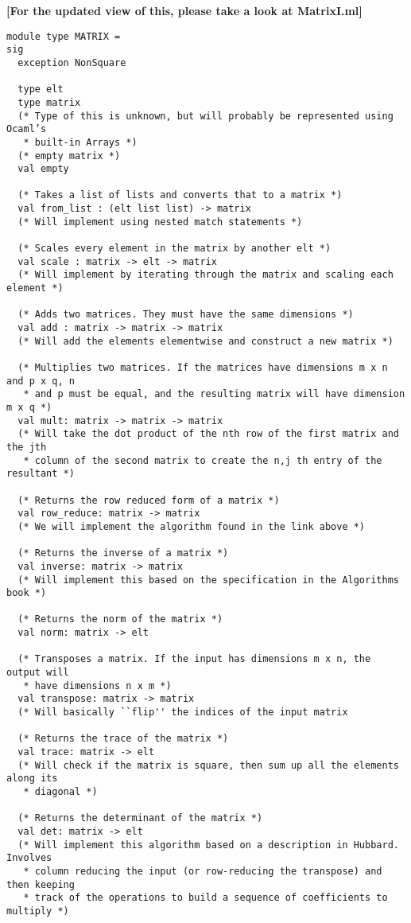 \documentclass[letterpaper,11pt]{article}
\newcommand{\annot}[1]{\textbf{\color{BrickRed} [#1]}}
\begin{document}
{\annot{For the updated view of this, please take a look at MatrixI.ml}}
\begin{verbatim}
module type MATRIX = 
sig
  exception NonSquare
  
  type elt
  type matrix
  (* Type of this is unknown, but will probably be represented using Ocaml’s
   * built-in Arrays *)
  (* empty matrix *)
  val empty

  (* Takes a list of lists and converts that to a matrix *)
  val from_list : (elt list list) -> matrix
  (* Will implement using nested match statements *)

  (* Scales every element in the matrix by another elt *)
  val scale : matrix -> elt -> matrix
  (* Will implement by iterating through the matrix and scaling each element *)

  (* Adds two matrices. They must have the same dimensions *)
  val add : matrix -> matrix -> matrix
  (* Will add the elements elementwise and construct a new matrix *)

  (* Multiplies two matrices. If the matrices have dimensions m x n and p x q, n
   * and p must be equal, and the resulting matrix will have dimension m x q *)
  val mult: matrix -> matrix -> matrix
  (* Will take the dot product of the nth row of the first matrix and the jth
   * column of the second matrix to create the n,j th entry of the resultant *)

  (* Returns the row reduced form of a matrix *)
  val row_reduce: matrix -> matrix 
  (* We will implement the algorithm found in the link above *)

  (* Returns the inverse of a matrix *)
  val inverse: matrix -> matrix
  (* Will implement this based on the specification in the Algorithms book *)

  (* Returns the norm of the matrix *)
  val norm: matrix -> elt

  (* Transposes a matrix. If the input has dimensions m x n, the output will
   * have dimensions n x m *)
  val transpose: matrix -> matrix
  (* Will basically ``flip'' the indices of the input matrix

  (* Returns the trace of the matrix *)
  val trace: matrix -> elt
  (* Will check if the matrix is square, then sum up all the elements along its
   * diagonal *)

  (* Returns the determinant of the matrix *)
  val det: matrix -> elt
  (* Will implement this algorithm based on a description in Hubbard. Involves
   * column reducing the input (or row-reducing the transpose) and then keeping 
   * track of the operations to build a sequence of coefficients to multiply *)


\end{verbatim}
\end{document}

